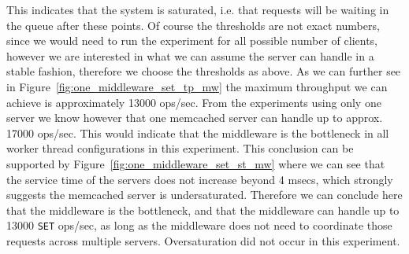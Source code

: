 \documentclass[11pt,a4paper]{article}
\begin{document}
%
This indicates that the system is saturated, i.e. that requests will be waiting in the queue after these points.
%
Of course the thresholds are not exact numbers, since we would need to run the experiment for all possible number of clients, however we are interested in what we can assume the server can handle in a stable fashion, therefore we choose the thresholds as above.
%
As we can further see in Figure~\ref{fig:one_middleware_set_tp_mw} the maximum throughput we can achieve is approximately 13000 ops/sec.
%
From the experiments using only one server we know however that one memcached server can handle up to approx. 17000 ops/sec.
%
This would indicate that the middleware is the bottleneck in all worker thread configurations in this experiment.
%
This conclusion can be supported by Figure~\ref{fig:one_middleware_set_st_mw} where we can see that the service time of the servers does not increase beyond 4 msecs, which strongly suggests the memcached server is undersaturated.
%
Therefore we can conclude here that the middleware is the bottleneck, and that the middleware can handle up to 13000 \texttt{SET} ops/sec, as long as the middleware does not need to coordinate those requests across multiple servers.
%
Oversaturation did not occur in this experiment.
%
\end{document}
